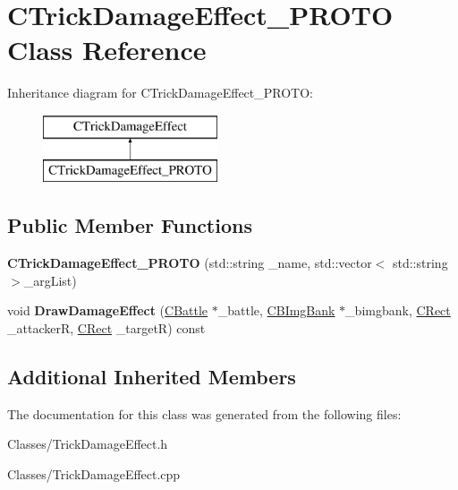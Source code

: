 \hypertarget{class_c_trick_damage_effect___p_r_o_t_o}{}\section{C\+Trick\+Damage\+Effect\+\_\+\+P\+R\+O\+TO Class Reference}
\label{class_c_trick_damage_effect___p_r_o_t_o}
Inheritance diagram for C\+Trick\+Damage\+Effect\+\_\+\+P\+R\+O\+TO\+:\begin{figure}[H]
\begin{center}
\leavevmode
\includegraphics[height=2.000000cm]{class_c_trick_damage_effect___p_r_o_t_o}
\end{center}
\end{figure}
\subsection*{Public Member Functions}
\begin{DoxyCompactItemize}
\item 
{\bfseries C\+Trick\+Damage\+Effect\+\_\+\+P\+R\+O\+TO} (std\+::string \+\_\+name, std\+::vector$<$ std\+::string $>$\+\_\+arg\+List)\hypertarget{class_c_trick_damage_effect___p_r_o_t_o_a8ab1a6483da6ba6823f9c458c068dae2}{}\label{class_c_trick_damage_effect___p_r_o_t_o_a8ab1a6483da6ba6823f9c458c068dae2}

\item 
void {\bfseries Draw\+Damage\+Effect} (\hyperlink{class_c_battle}{C\+Battle} $\ast$\+\_\+battle, \hyperlink{class_c_b_img_bank}{C\+B\+Img\+Bank} $\ast$\+\_\+bimgbank, \hyperlink{class_c_rect}{C\+Rect} \+\_\+attackerR, \hyperlink{class_c_rect}{C\+Rect} \+\_\+targetR) const \hypertarget{class_c_trick_damage_effect___p_r_o_t_o_a658f84618db2d90386c0802672089137}{}\label{class_c_trick_damage_effect___p_r_o_t_o_a658f84618db2d90386c0802672089137}

\end{DoxyCompactItemize}
\subsection*{Additional Inherited Members}


The documentation for this class was generated from the following files\+:\begin{DoxyCompactItemize}
\item 
Classes/Trick\+Damage\+Effect.\+h\item 
Classes/Trick\+Damage\+Effect.\+cpp\end{DoxyCompactItemize}
